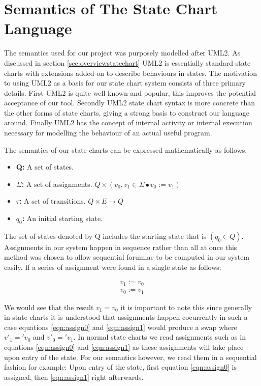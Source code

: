 \section{Semantics of The State Chart Language}

The semantics used for our project was purposely modelled after UML2. As discussed in section \ref{sec:overviewstatechart} UML2 is essentially standard state charts with extensions added on to describe behaviours in states. The motivation to using UML2 as a basis for our state chart system consists of three primary details. First UML2 is quite well known and popular, this improves the potential acceptance of our tool. Secondly UML2 state chart syntax is more concrete than the other forms of state charts, giving a strong basis to construct our language around. Finally UML2 has the concept of internal activity or internal execution necessary for modelling the behaviour of an actual useful program.

The semantics of our state charts can be expressed mathematically as follows:

\begin{itemize}
	\item \textbf{Q:} A set of states.
	\item \textbf{$\Sigma$:} A set of assignments. $Q \times (v_0,v_1 \in \Sigma \bullet v_0 := v_1)$
	\item \textbf{$\tau$:} A set of transitions. $Q \times E \rightarrow Q$
	\item \textbf{$q_0$:} An initial starting state.
\end{itemize}

The set of states denoted by Q includes the starting state that is $(q_0 \in Q)$. Assignments in our system happen in sequence rather than all at once this method was chosen to allow sequential forumlae to be computed in our system easily. If a series of assignment were found in a single state as follows:

\begin{align}
v_1 := v_0 \label{eqn:assign0} \\ 
v_0 := v_1 \label{eqn:assign1}
\end{align}

We would see that the result $v_1 = v_0$ it is important to note this since generally in state charts it is understood that assignments happen cocurrently in such a case equations \ref{eqn:assign0} and \ref{eqn:assign1} would produce a swap where $v'_1 = 'v_0$ and $v'_0 = 'v_1$. In normal state charts we read assignments such as in equations \ref{eqn:assign0} and \ref{eqn:assign1} as these assignments will take place upon entry of the state. For our semantics however, we read them in a sequential fashion for example: Upon entry of the state, first equation \ref{eqn:assign0} is assigned, then \ref{eqn:assign1} right afterwards.

